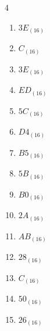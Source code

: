 \begin{multicols}{4}
\begin{enumerate}
        \phantom{$=239$}

  \item $3E_{(16)}$

        \phantom{$=62$}

  \item $C_{(16)}$

        \phantom{$=12$}

  \item $3E_{(16)}$

        \phantom{$=62$}

  \item $ED_{(16)}$

        \phantom{$=237$}

  \item $5C_{(16)}$

        \phantom{$=92$}

  \item $D4_{(16)}$

        \phantom{$=212$}

  \item $B5_{(16)}$

        \phantom{$=181$}

  \item $5B_{(16)}$

        \phantom{$=91$}

  \item $B0_{(16)}$

        \phantom{$=176$}

  \item $2A_{(16)}$

        \phantom{$=42$}

  \item $AB_{(16)}$

        \phantom{$=171$}

  \item $28_{(16)}$

        \phantom{$=40$}

  \item $C_{(16)}$

        \phantom{$=12$}

\columnbreak %

  \item $50_{(16)}$

        \phantom{$=80$}

  \item $26_{(16)}$

        \phantom{$=38$}


\end{enumerate}
\end{multicols}
